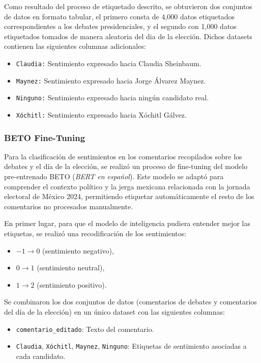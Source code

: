 \documentclass[10pt, a4paper]{article}
\begin{document}
	
	Como resultado del proceso de etiquetado descrito, se obtuvieron dos conjuntos de datos en formato tabular, el primero consta de 4,000 datos etiquetados correspondientes a los debates presidenciales, y el segundo con 1,000 datos etiquetados tomados de manera aleatoria del dia de la elección. Dichos datasets contienen las siguientes columnas adicionales:
	
	\begin{itemize}
		\item \texttt{Claudia:} Sentimiento expresado hacia Claudia Sheinbaum.
		\item \texttt{Maynez:} Sentimiento expresado hacia Jorge Álvarez Maynez.
		\item \texttt{Ninguno:} Sentimiento expresado hacia ningún candidato real.
		\item \texttt{Xóchitl:} Sentimiento expresado hacia Xóchitl Gálvez.
	\end{itemize}
	
	
	
	\subsubsection{BETO Fine-Tuning}
	
	Para la clasificación de sentimientos en los comentarios recopilados sobre los debates y el día de la elección, se realizó un proceso de fine-tuning del modelo pre-entrenado BETO (\textit{BERT en español}). Este modelo se adaptó para comprender el contexto político y la jerga mexicana relacionada con la jornada electoral de México 2024, permitiendo etiquetar automáticamente el resto de los comentarios no procesados manualmente.
	
	En primer lugar, para que el modelo de inteligencia pudiera entender mejor las etiquetas, se realizó una recodificación de los sentimientos:
	\begin{itemize}
		\item \(-1 \rightarrow 0\) (sentimiento negativo),
		\item \(0 \rightarrow 1\) (sentimiento neutral),
		\item \(1 \rightarrow 2\) (sentimiento positivo).
	\end{itemize}

	
	Se combinaron los dos conjuntos de datos (comentarios de debates y comentarios del día de la elección) en un único dataset con las siguientes columnas:
	\begin{itemize}
		\item \texttt{comentario\_editado}: Texto del comentario.
		\item \texttt{Claudia}, \texttt{Xóchitl}, \texttt{Maynez}, \texttt{Ninguno}: Etiquetas de sentimiento asociadas a cada candidato.
	\end{itemize}
	
\end{document}
